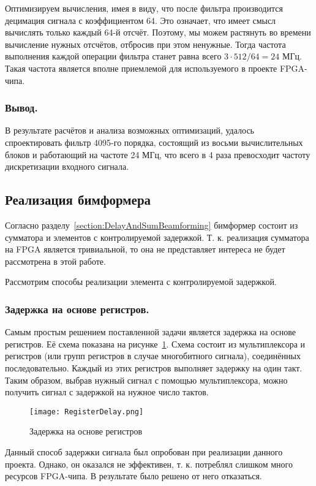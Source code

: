 Оптимизируем вычисления, имея в виду, что после фильтра производится децимация сигнала с коэффициентом 64. Это означает, что имеет смысл вычислять только каждый 64-й отсчёт. Поэтому, мы можем растянуть во времени вычисление нужных отсчётов, отбросив при этом ненужные. Тогда частота выполнения каждой операции фильтра станет равна всего $3 \cdot{} 512 / 64 = 24$ МГц. Такая частота является вполне приемлемой для используемого в проекте FPGA-чипа.

\subsubsection{Вывод. }
В результате расчётов и анализа возможных оптимизаций, удалось спроектировать фильтр 4095-го порядка, состоящий из восьми вычислительных блоков и работающий на частоте 24 МГц, что всего в 4 раза превосходит частоту дискретизации входного сигнала.

\subsection{Реализация \dands{} бимформера}
\label{section:BeamformerBuilding}
Согласно разделу~\ref{section:DelayAndSumBeamforming} \dands{} бимформер состоит из сумматора и элементов с контролируемой задержкой. Т. к. реализация сумматора на FPGA является тривиальной, то она не представляет интереса не будет рассмотрена в этой работе.

Рассмотрим способы реализации элемента с контролируемой задержкой.

\subsubsection{Задержка на основе регистров. }
Самым простым решением поставленной задачи является задержка на основе регистров. Её схема показана на рисунке~\ref{fig:RegisterDelay}. Схема состоит из мультиплексора и регистров (или групп регистров в случае многобитного сигнала), соединённых последовательно. Каждый из этих регистров выполняет задержку на один такт. Таким образом, выбрав нужный сигнал с помощью мультиплексора, можно получить сигнал с задержкой на нужное число тактов.
\begin{figure}[ht]
	\centering
	\texttt{[image: RegisterDelay.png]}  
	\caption{Задержка на основе регистров}
	\label{fig:RegisterDelay}
\end{figure}

Данный способ задержки сигнала был опробован при реализации данного проекта. Однако, он оказался не эффективен, т. к. потреблял слишком много ресурсов FPGA-чипа. В результате было решено от него отказаться.

